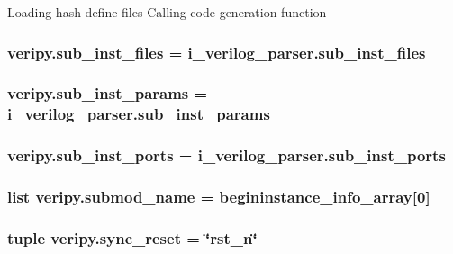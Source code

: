 Loading hash define files Calling code generation function \hypertarget{namespaceveripy_a0adf40cf6c1ebe154b70e8dc46889228}{
\subsubsection[{sub\-\_\-inst\-\_\-files}]{\setlength{\rightskip}{0pt plus 5cm}veripy.\-sub\-\_\-inst\-\_\-files = i\-\_\-verilog\-\_\-parser.\-sub\-\_\-inst\-\_\-files}}\label{namespaceveripy_a0adf40cf6c1ebe154b70e8dc46889228}
\hypertarget{namespaceveripy_a3d4e4d7b77fb2b4b84c418a101755e7c}{
\subsubsection[{sub\-\_\-inst\-\_\-params}]{\setlength{\rightskip}{0pt plus 5cm}veripy.\-sub\-\_\-inst\-\_\-params = i\-\_\-verilog\-\_\-parser.\-sub\-\_\-inst\-\_\-params}}\label{namespaceveripy_a3d4e4d7b77fb2b4b84c418a101755e7c}
\hypertarget{namespaceveripy_a2b7f6e748a1166c9272af6cc49f384bb}{
\subsubsection[{sub\-\_\-inst\-\_\-ports}]{\setlength{\rightskip}{0pt plus 5cm}veripy.\-sub\-\_\-inst\-\_\-ports = i\-\_\-verilog\-\_\-parser.\-sub\-\_\-inst\-\_\-ports}}\label{namespaceveripy_a2b7f6e748a1166c9272af6cc49f384bb}
\hypertarget{namespaceveripy_ad4f69029876b9bb2e6cb769770e15fd4}{
\subsubsection[{submod\-\_\-name}]{\setlength{\rightskip}{0pt plus 5cm}list veripy.\-submod\-\_\-name = {\bf begininstance\-\_\-info\-\_\-array}\mbox{[}0\mbox{]}}}\label{namespaceveripy_ad4f69029876b9bb2e6cb769770e15fd4}
\hypertarget{namespaceveripy_a010f1413a986d15ce37b5d2cb4170578}{
\subsubsection[{sync\-\_\-reset}]{\setlength{\rightskip}{0pt plus 5cm}tuple veripy.\-sync\-\_\-reset = \char`\"{}rst\-\_\-n\char`\"{}}}\label{namespaceveripy_a010f1413a986d15ce37b5d2cb4170578}
